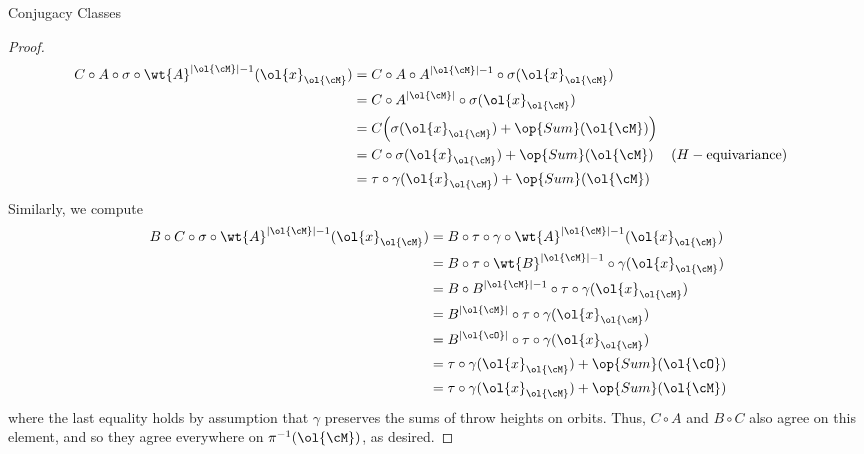\documentclass[12nt]{article}
\theoremstyle{plain}
\begin{document}
\begin{subsection}{Conjugacy Classes}
\begin{proof}
\begin{align*}
	C \circ A \circ \sigma \circ \wt{A}^{|\ol{\cM}| - 1}(\ol{x}_{\ol{\cM}}) &= C \circ A \circ A^{|\ol{\cM}| - 1} \circ \sigma(\ol{x}_{\ol{\cM}}) \\
		&= C \circ A^{|\ol{\cM}|} \circ \sigma (\ol{x}_{\ol{\cM}}) \\
		&= C  \Big( \sigma (\ol{x}_{\ol{\cM}}) + \op{Sum}(\ol{\cM}) \Big) \\
		&= C \circ \sigma (\ol{x}_{\ol{\cM}}) + \op{Sum}(\ol{\cM}) && (H-\text{equivariance})\\
		&= \tau \circ \gamma(\ol{x}_{\ol{\cM}}) + \op{Sum}(\ol{\cM})
\end{align*}
Similarly, we compute
\begin{align*}
	B \circ C \circ \sigma \circ \wt{A}^{|\ol{\cM}| - 1}(\ol{x}_{\ol{\cM}}) &=  B \circ \tau \circ \gamma \circ \wt{A}^{|\ol{\cM}| - 1}(\ol{x}_{\ol{\cM}}) \\
	&= B \circ \tau \circ \wt{B}^{|\ol{\cM}| - 1} \circ \gamma (\ol{x}_{\ol{\cM}}) \\
	&= B \circ B^{|\ol{\cM}| - 1} \circ \tau \circ \gamma (\ol{x}_{\ol{\cM}}) \\
	&= B^{|\ol{\cM}|} \circ \tau \circ \gamma(\ol{x}_{\ol{\cM}}) \\
	&= B^{|\ol{\cO}|} \circ \tau \circ \gamma(\ol{x}_{\ol{\cM}}) \\
	&= \tau \circ \gamma (\ol{x}_{\ol{\cM}}) + \op{Sum}(\ol{\cO}) \\
	&= \tau \circ \gamma (\ol{x}_{\ol{\cM}}) + \op{Sum}(\ol{\cM}) 
\end{align*}
where the last equality holds by assumption that $\gamma$ preserves the sums of throw heights on orbits. Thus, $C \circ A$ and $B \circ C$ also agree on this element, and so they agree everywhere on $\pi^{-1}(\ol{\cM})$, as desired.

\end{proof}


\end{subsection}
\end{document}
